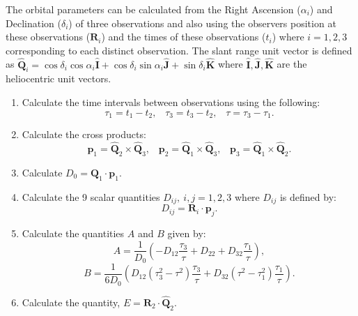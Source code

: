 \documentclass[10pt, twocolumn]{revtex4}    %
\begin{document}
\vspace{1ex}
The orbital parameters can be calculated from the Right Ascension ($\alpha_i$) and Declination ($\delta_i$) of three observations and also using the observers position at these observations ($\mathbf{R}_i$) and the times of these observations ($t_i$) where $i=1,2,3$ corresponding to each distinct observation. The slant range unit vector is defined as $\mathbf{\hat{Q}}_i = \cos\delta_i \cos\alpha_i \mathbf{\hat{I}} + \cos\delta_i \sin\alpha_i \mathbf{\hat{J}} + \sin \delta_i \mathbf{\hat{K}}$ where $\mathbf{\hat{I},\hat{J},\hat{K}}$ are the heliocentric unit vectors.
\begin{enumerate}
 \item Calculate the time intervals between observations using the following:
 \begin{equation}
 \tau_1 = t_1 - t_2, \hspace{10pt} \tau_3 = t_3 - t_2, \hspace{10pt} \tau = \tau_3 - \tau_1.
 \end{equation}
 \item Calculate the cross products: 
 \begin{equation}
 \mathbf{p}_1 = \mathbf{\hat{Q}}_2 \times \mathbf{\hat{Q}}_3, \hspace{10pt} \mathbf{p}_2 = \mathbf{\hat{Q}}_1 \times \mathbf{\hat{Q}}_3, \hspace{10pt} \mathbf{p}_3 = \mathbf{\hat{Q}}_1 \times \mathbf{\hat{Q}}_2.
 \end{equation}
 \item Calculate $D_0 = \mathbf{\hat{Q}}_1 \cdot \mathbf{p}_1$.
 \item Calculate the 9 scalar quantities $D_{ij},\ i,j=1,2,3$ where $D_{ij}$ is defined by:
 \begin{equation}
 D_{ij} = \mathbf{R}_i \cdot \mathbf{p}_j.
 \end{equation} 
 \item Calculate the quantities $A$ and $B$ given by:
 \begin{equation}
 A = \frac{1}{D_0}\left(-D_{12}\frac{\tau_3}{\tau} +D_{22} + D_{32} \frac{\tau_1}{\tau} \right),
 \end{equation}
 \begin{equation}
 B = \frac{1}{6D_0} \left(D_{12}(\tau^2_3 - \tau^2)\frac{\tau_3}{\tau} + D_{32}(\tau^2 - \tau_1^2)\frac{\tau_1}{\tau}\right).
 \end{equation}
 \item Calculate the quantity, $E = \mathbf{R}_2 \cdot \mathbf{\hat{Q}}_2$.

\end{enumerate}
\end{document}
